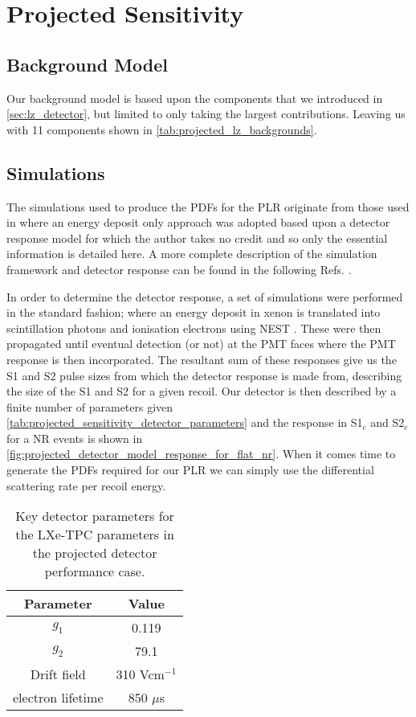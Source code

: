 \section{Projected Sensitivity}

\subsection{Background Model}
\par
Our background model is based upon the components that we introduced in \autoref{sec:lz_detector}, but limited to only taking the largest contributions.
Leaving us with 11 components shown in \autoref{tab:projected_lz_backgrounds}.


\subsection{Simulations}
\par
The simulations used to produce the PDFs for the PLR originate from those used in \cite{LZ_projected_sensitivity_paper_ref} where an energy deposit only approach was adopted based upon a detector response model for which the author takes no credit and so only the essential information is detailed here.
A more complete description of the simulation framework and detector response can be found in the following Refs. \cite{lz_simulations_ref,theresafruth_thesis_ref}.
\par
In order to determine the detector response, a set of simulations were performed in the standard fashion; where an energy deposit in xenon is translated into scintillation photons and ionisation electrons using NEST \cite{nest_1_ref,nest_2_ref}.
These were then propagated until eventual detection (or not) at the PMT faces where the PMT response is then incorporated.
The resultant sum of these responses give us the S1 and S2 pulse sizes from which the detector response is made from, describing the size of the S1 and S2 for a given recoil.
Our detector is then described by a finite number of parameters given \autoref{tab:projected_sensitivity_detector_parameters} and the response in S1$_c$ and S2$_c$ for a NR events is shown in \autoref{fig:projected_detector_model_response_for_flat_nr}.
When it comes time to generate the PDFs required for our PLR we can simply use the differential scattering rate per recoil energy.
\begin{table}[]
    \centering
    \begin{tabular}{c|c}
        Parameter   & Value  \\ \hline
        $g_{1}$     & 0.119 \\
        $g_{2}$     & 79.1  \\
        Drift field & 310 Vcm$^{-1}$ \\
        electron lifetime & 850 $\mu$s
    \end{tabular}
    \caption{Key detector parameters for the LXe-TPC parameters in the projected detector performance case.}
    \label{tab:projected_sensitivity_detector_parameters}
\end{table}


